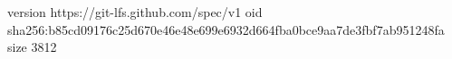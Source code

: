 version https://git-lfs.github.com/spec/v1
oid sha256:b85cd09176c25d670e46e48e699e6932d664fba0bce9aa7de3fbf7ab951248fa
size 3812
